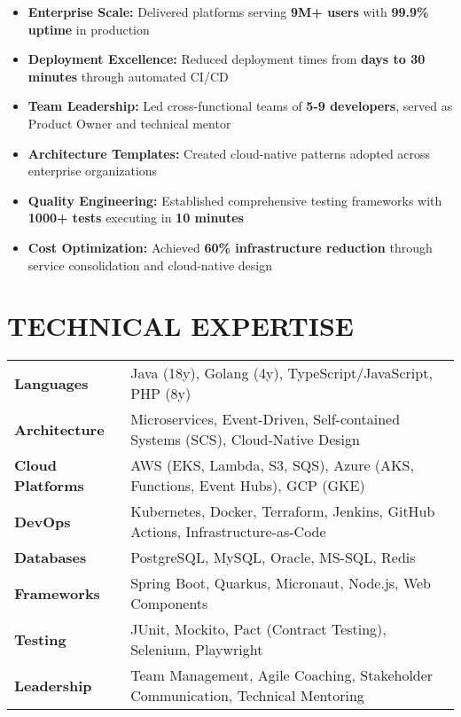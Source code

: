 \documentclass[10pt,a4paper]{article}
\begin{document}
\begin{itemize}
    \item \textbf{Enterprise Scale:} Delivered platforms serving \textbf{9M+ users} with \textbf{99.9\% uptime} in production
    \item \textbf{Deployment Excellence:} Reduced deployment times from \textbf{days to 30 minutes} through automated CI/CD
    \item \textbf{Team Leadership:} Led cross-functional teams of \textbf{5-9 developers}, served as Product Owner and technical mentor
    \item \textbf{Architecture Templates:} Created cloud-native patterns adopted across enterprise organizations
    \item \textbf{Quality Engineering:} Established comprehensive testing frameworks with \textbf{1000+ tests} executing in \textbf{10 minutes}
    \item \textbf{Cost Optimization:} Achieved \textbf{60\% infrastructure reduction} through service consolidation and cloud-native design
\end{itemize}

\vspace{6pt}

\section{TECHNICAL EXPERTISE}

\begin{tabularx}{\textwidth}{>{\bfseries\color{darkblue}}l X}
Languages & Java (18y), Golang (4y), TypeScript/JavaScript, PHP (8y) \\
Architecture & Microservices, Event-Driven, Self-contained Systems (SCS), Cloud-Native Design \\
Cloud Platforms & AWS (EKS, Lambda, S3, SQS), Azure (AKS, Functions, Event Hubs), GCP (GKE) \\
DevOps & Kubernetes, Docker, Terraform, Jenkins, GitHub Actions, Infrastructure-as-Code \\
Databases & PostgreSQL, MySQL, Oracle, MS-SQL, Redis \\
Frameworks & Spring Boot, Quarkus, Micronaut, Node.js, Web Components \\
Testing & JUnit, Mockito, Pact (Contract Testing), Selenium, Playwright \\
Leadership & Team Management, Agile Coaching, Stakeholder Communication, Technical Mentoring
\end{tabularx}
\end{document}
